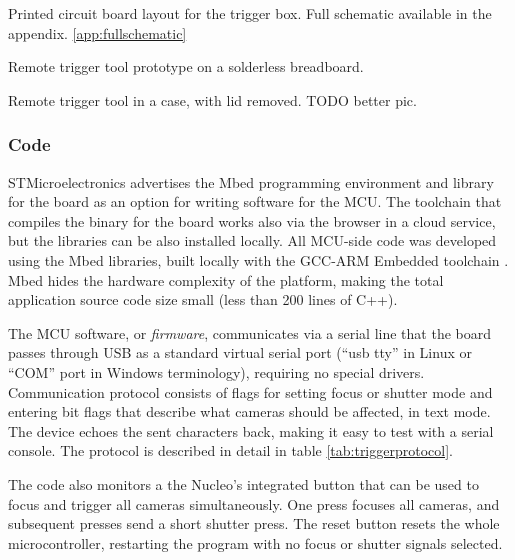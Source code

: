 
{Printed circuit board layout for the trigger box. Full schematic available in the appendix. \ref{app:fullschematic}}

{Remote trigger tool prototype on a solderless breadboard.}

{Remote trigger tool in a case, with lid removed. TODO better pic.}

\subsubsection{Code}

STMicroelectronics advertises the Mbed programming environment and library for the board as an option for writing software for the MCU.
The toolchain that compiles the binary for the board works also via the browser in a cloud service, but the libraries can be also installed locally.
All MCU-side code was developed using the Mbed libraries, built locally with the GCC-ARM Embedded toolchain \cite{launchpad-gcc-arm}.
Mbed hides the hardware complexity of the platform, making the total application source code size small (less than 200 lines of C++).

The MCU software, or \emph{firmware}, communicates via a serial line that the board passes through USB as a standard virtual serial port (``usb tty'' in Linux or ``COM'' port in Windows terminology), requiring no special drivers.
Communication protocol consists of flags for setting focus or shutter mode and entering bit flags that describe what cameras should be affected, in text mode.
The device echoes the sent characters back, making it easy to test with a serial console.
The protocol is described in detail in table \ref{tab:triggerprotocol}.

The code also monitors a the Nucleo's integrated button that can be used to focus and trigger all cameras simultaneously.
One press focuses all cameras, and subsequent presses send a short shutter press.
The reset button resets the whole microcontroller, restarting the program with no focus or shutter signals selected.

